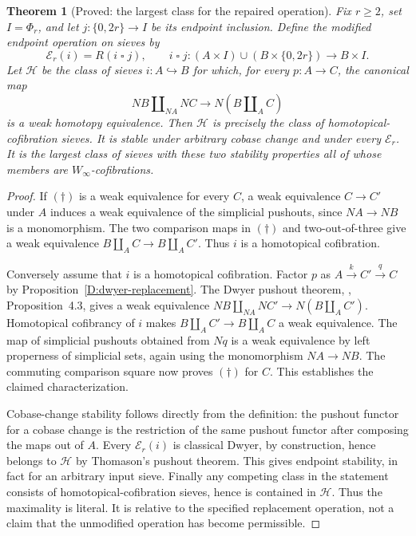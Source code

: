 \documentclass[11pt,a4paper]{article}
\newtheorem{theorem}{Theorem}[section]
\theoremstyle{definition}
\theoremstyle{remark}
\begin{document}
\begin{theorem}[Proved: the largest class for the repaired operation]\label{D:maximal-class}
Fix $r\geq2$, set $I=\Phi_r$, and let $j:\{0,2r\}\to I$ be its endpoint inclusion. Define the modified endpoint operation on sieves by
\[
 \mathcal E_r(i)=R(i\mathbin{\square}j),\qquad
 i\mathbin{\square}j:
 (A\times I)\cup(B\times\{0,2r\})\longrightarrow B\times I.
\]
Let $\mathcal H$ be the class of sieves $i:A\hookrightarrow B$ for which, for every $p:A\to C$, the canonical map
\[
 NB\amalg_{NA}NC\longrightarrow N(B\amalg_A C)
\tag{$\dagger$}
\]
is a weak homotopy equivalence. Then $\mathcal H$ is precisely the class of homotopical-cofibration sieves. It is stable under arbitrary cobase change and under every $\mathcal E_r$. It is the largest class of sieves with these two stability properties all of whose members are $W_\infty$-cofibrations.
\end{theorem}
\begin{proof}
If $(\dagger)$ is a weak equivalence for every $C$, a weak equivalence $C\to C'$ under $A$ induces a weak equivalence of the simplicial pushouts, since $NA\to NB$ is a monomorphism. The two comparison maps in $(\dagger)$ and two-out-of-three give a weak equivalence $B\amalg_A C\to B\amalg_A C'$. Thus $i$ is a homotopical cofibration.

Conversely assume that $i$ is a homotopical cofibration. Factor $p$ as $A\xrightarrow{k}C'\xrightarrow{q}C$ by Proposition~\ref{D:dwyer-replacement}. The Dwyer pushout theorem, \citet{Thomason1980}, Proposition~4.3, gives a weak equivalence $NB\amalg_{NA}NC'\to N(B\amalg_A C')$. Homotopical cofibrancy of $i$ makes $B\amalg_A C'\to B\amalg_A C$ a weak equivalence. The map of simplicial pushouts obtained from $Nq$ is a weak equivalence by left properness of simplicial sets, again using the monomorphism $NA\to NB$. The commuting comparison square now proves $(\dagger)$ for $C$. This establishes the claimed characterization.

Cobase-change stability follows directly from the definition: the pushout functor for a cobase change is the restriction of the same pushout functor after composing the maps out of $A$. Every $\mathcal E_r(i)$ is classical Dwyer, by construction, hence belongs to $\mathcal H$ by Thomason's pushout theorem. This gives endpoint stability, in fact for an arbitrary input sieve. Finally any competing class in the statement consists of homotopical-cofibration sieves, hence is contained in $\mathcal H$. Thus the maximality is literal. It is relative to the specified replacement operation, not a claim that the unmodified operation has become permissible.
\end{proof}
\end{document}
